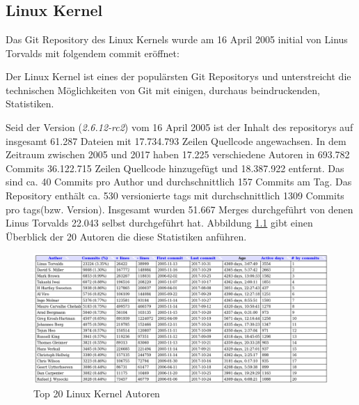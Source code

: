 \chapter{\lookout}
\label{cha:lookout}
\section{Linux Kernel}\label{cha:kernel}
Das Git Repository des Linux Kernels wurde am 16 April 2005 initial von Linus
Torvalds mit folgendem \gls{commit}\cite{link:linuxgit} eröffnet:



Der Linux Kernel ist eines der populärsten Git Repositorys und unterstreicht
die technischen Möglichkeiten von Git mit einigen, durchaus beindruckenden,
Statistiken.

Seid der Version (\textit{2.6.12-rc2}) vom 16 April 2005 ist der Inhalt des
\glspl{repository} auf insgesamt 61.287 Dateien mit 17.734.793 Zeilen Quellcode
angewachsen. In dem Zeitraum zwischen 2005 und 2017 haben 17.225 verschiedene
Autoren in 693.782 Commits 36.122.715 Zeilen Quellcode hinzugefügt und
18.387.922 entfernt. Das sind ca. 40 Commits pro Author und durchschnittlich
157 Commits am Tag. Das Repository enthält ca. 530 versionierte \glspl{tag}
mit durchschnittlich 1309 Commits pro \glspl{tag}(bzw. Version). Insgesamt wurden
51.667 Merges durchgeführt von denen Linus Torvalds 22.043 selbst durchgeführt
hat. Abbildung \ref{top20} gibt einen Überblick der 20 Autoren die diese
Statistiken anführen.

\begin{figure}
	\centering
  \includegraphics[scale=0.40]{images/top_20_of_linux_authors.png}
	\caption{Top 20 Linux Kernel Autoren}
	\label{top20}
\end{figure}


